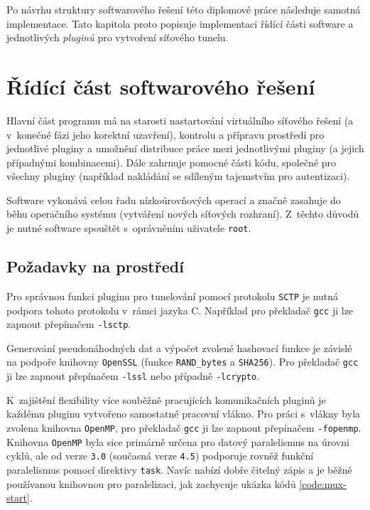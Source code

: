 \documentclass[thesis=M,czech]{FITthesis}[2012/10/20]
\begin{document}
Po návrhu struktury softwarového řešení této diplomové práce následuje samotná implementace. Tato kapitola proto popisuje implementaci řídící části software a jednotlivých \textit{pluginů} pro vytvoření síťového tunelu.


\section{Řídící část softwarového řešení}

Hlavní část programu má na starosti nastartování virtuálního síťového řešení (a v~konečné fázi jeho korektní uzavření), kontrolu a přípravu prostředí pro jednotlivé pluginy a umožnění distribuce práce mezi jednotlivými pluginy (a jejich případnými kombinacemi). Dále zahrnuje pomocné části kódu, společné pro všechny pluginy (například nakládání se sdíleným tajemstvím pro autentizaci).

Software vykonává celou řadu nízkoúrovňových operací a značně zasahuje do běhu operačního systému (vytváření nových síťových rozhraní). Z~těchto důvodů je nutné software spouštět s~oprávněním uživatele \texttt{root}.

\subsection{Požadavky na prostředí}

Pro správnou funkci pluginu pro tunelování pomocí protokolu \texttt{SCTP} je nutná podpora tohoto protokolu v~rámci jazyka C. Například pro překladač \texttt{gcc} ji lze zapnout přepínačem \texttt{-lsctp}.

Generování pseudonáhodných dat a výpočet zvolené hashovací funkce je závislé na podpoře knihovny \texttt{OpenSSL} (funkce \texttt{RAND\_bytes} a \texttt{SHA256}). Pro překladač \texttt{gcc} ji lze zapnout přepínačem \texttt{-lssl} nebo případně \texttt{-lcrypto}.

K~zajištění flexibility více souběžně pracujících komunikačních pluginů je každému pluginu vytvořeno samostatné pracovní vlákno. Pro práci s~vlákny byla zvolena knihovna \texttt{OpenMP}, pro překladač \texttt{gcc} ji lze zapnout přepínačem \texttt{-fopenmp}. Knihovna \texttt{OpenMP} byla sice primárně určena pro datový paralelismus na úrovni cyklů, ale od verze \texttt{3.0} (současná verze \texttt{4.5}) podporuje rovněž funkční paralelismus pomocí direktivy \texttt{task}. Navíc nabízí dobře čitelný zápis a je běžně používanou knihovnou pro paralelizaci, jak zachycuje ukázka kódů \ref{code:mux-start}.
\end{document}
